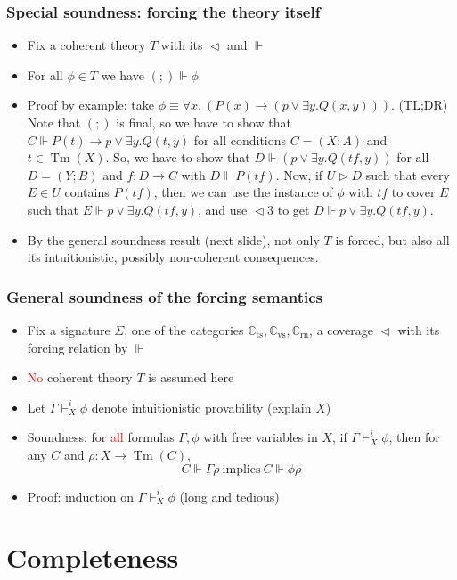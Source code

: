 \documentclass[handout,11pt]{beamer}
\newcommand{\red}[1]{\textcolor{red}{#1}}
\newcommand{\covd}{\mathrel{\vartriangleleft}}
\newcommand{\covs}{\mathrel{\vartriangleright}}
\newcommand*{\subvs}{_{\mathrm{vs}}}
\newcommand*{\subrn}{_{\mathrm{rn}}}
\newcommand*{\subts}{_{\mathrm{ts}}}
\newcommand{\Cvs}{\mathbb{C}\subvs}
\newcommand{\Crn}{\mathbb{C}\subrn}
\newcommand{\Cts}{\mathbb{C}\subts}
\DeclareMathOperator{\Tm}{Tm}
\begin{document}
\begin{frame}
\frametitle{Special soundness: forcing the theory itself}
\begin{itemize}[<+->]
 \item Fix a coherent theory $T$ with its $\covd$ and $\Vdash$    
 \item For all $\phi\in T$ we have $(;)\Vdash\phi$
 \item Proof by example: take
 $\phi\equiv\forall x.~(P(x)\to (p\lor \exists y. Q(x,y)))$.
 (TL;DR) Note that $(;)$ is final, so we have to show that 
 $C\Vdash P(t)\to p\lor \exists y. Q(t,y)$ for all
 conditions $C=(X;A)$ and $t\in\Tm(X)$. So, we have to show
 that $D\Vdash (p\lor \exists y. Q(tf,y))$ for all $D=(Y;B)$
 and $f:D\to C$ with $D\Vdash P(tf)$. Now, if $U\covs D$ such 
 that every $E\in U$ contains $P(tf)$, then we can use
 the instance of $\phi$ with $tf$ to cover $E$
 such that $E\Vdash p\lor \exists y. Q(tf,y)$,
 and use ${\covd}3$ to get $D\Vdash p\lor \exists y. Q(tf,y)$.
 \item By the general soundness result (next slide),
 not only $T$ is forced, but also all its intuitionistic,
 possibly non-coherent consequences.
 \end{itemize}
\end{frame}

\begin{frame}
\frametitle{General soundness of the forcing semantics}
\begin{itemize}[<+->]
 \item Fix a signature $\Sigma$, one of the categories $\Cts,\Cvs,\Crn$, 
 a coverage $\covd$ with its forcing relation by $\Vdash$
 \item \red{No} coherent theory $T$ is assumed here
 \item Let $\Gamma\vdash_X^i \phi$ denote intuitionistic 
 provability (explain $X$) 
 \item Soundness: for \red{all} formulas $\Gamma,\phi$ 
 with free variables in $X$, if $\Gamma\vdash_X^i \phi$, then for any $C$
 and $\rho: X\to\Tm(C)$, 
 $$C\Vdash \Gamma\rho~\text{implies}~C\Vdash \phi\rho$$
 \item Proof: induction on $\Gamma\vdash_X^i \phi$ (long and tedious)
 \end{itemize}
\end{frame}

\section{Completeness}
\end{document}

